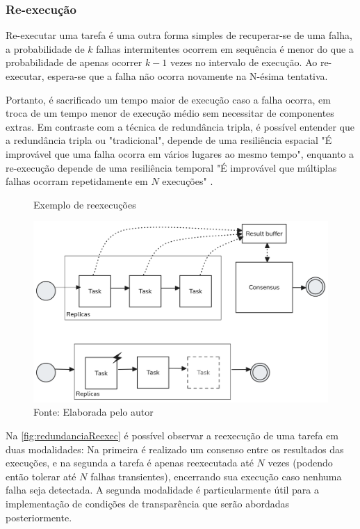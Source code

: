 \subsubsection{Re-execução}

Re-executar uma tarefa é uma outra forma simples de recuperar-se de uma falha, a probabilidade de $k$ falhas intermitentes ocorrem em sequência é menor do que a probabilidade de apenas ocorrer $k - 1$ vezes no intervalo de execução. Ao re-executar, espera-se que a falha não ocorra novamente na N-ésima tentativa. \cite{DependabilityInEmbeddedSystems}

Portanto, é sacrificado um tempo maior de execução caso a falha ocorra, em troca de um tempo menor de execução médio sem necessitar de componentes extras. Em contraste com a técnica de redundância tripla, é possível entender que a redundância tripla ou "tradicional", depende de uma resiliência espacial "É improvável que uma falha ocorra em vários lugares ao mesmo tempo", enquanto a re-execução depende de uma resiliência temporal "É improvável que múltiplas falhas ocorram repetidamente em $N$ execuções" \cite{FaultTolerantSystems}.

\begin{figure}[H]
    \centering
	\captionsetup{justification=centering}
    \caption{Exemplo de reexecuções}
    \includegraphics[width=1.0\textwidth]{assets/redundancia_reexec.png}
	\captionsetup{justification=raggedright}
    \caption*{Fonte: Elaborada pelo autor}
    \label{fig:redundanciaReexec}
\end{figure}

Na \autoref{fig:redundanciaReexec} é possível observar a reexecução de uma tarefa em duas modalidades: Na primeira é realizado um consenso entre os resultados das execuções, e na segunda a tarefa é apenas reexecutada até $N$ vezes (podendo então tolerar até $N$ falhas transientes), encerrando sua execução caso nenhuma falha seja detectada. A segunda modalidade é particularmente útil para a implementação de condições de transparência \cite{SchedAndOptOfDistributedFT} que serão abordadas posteriormente.

